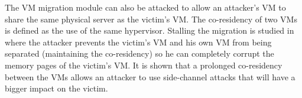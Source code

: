 The VM migration module can also be attacked to allow an attacker's VM to share the same physical server as the victim's VM. The co-residency of two VMs is defined as the use of the same hypervisor. Stalling the migration is studied in~\cite{stalling-atya2017} where the attacker prevents the victim's VM and his own VM from being separated (\ie maintaining the co-residency) so he can completely corrupt the memory pages of the victim's VM. It is shown that a prolonged co-residency between the VMs allows an attacker to use side-channel attacks that will have a bigger impact on the victim.

\begin{table}[ht]
\end{table}
